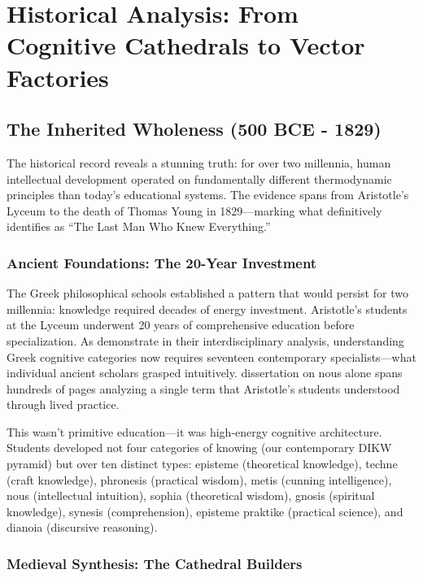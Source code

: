 \section{Historical Analysis: From Cognitive Cathedrals to Vector Factories}

\subsection{The Inherited Wholeness (500 BCE - 1829)}

The historical record reveals a stunning truth: for over two millennia, human intellectual development operated on fundamentally different thermodynamic principles than today's educational systems. The evidence spans from Aristotle's Lyceum to the death of Thomas Young in 1829---marking what \citet{robinson2006} definitively identifies as ``The Last Man Who Knew Everything.''

\subsubsection{Ancient Foundations: The 20-Year Investment}

The Greek philosophical schools established a pattern that would persist for two millennia: knowledge required decades of energy investment. Aristotle's students at the Lyceum underwent 20 years of comprehensive education before specialization. As \citet{mouzala2024} demonstrate in their interdisciplinary analysis, understanding Greek cognitive categories now requires seventeen contemporary specialists---what individual ancient scholars grasped intuitively. \citet{erkizan1997} dissertation on nous alone spans hundreds of pages analyzing a single term that Aristotle's students understood through lived practice.

This wasn't primitive education---it was high-energy cognitive architecture. Students developed not four categories of knowing (our contemporary DIKW pyramid) but over ten distinct types: episteme (theoretical knowledge), techne (craft knowledge), phronesis (practical wisdom), metis (cunning intelligence), nous (intellectual intuition), sophia (theoretical wisdom), gnosis (spiritual knowledge), synesis (comprehension), episteme praktike (practical science), and dianoia (discursive reasoning).

\subsubsection{Medieval Synthesis: The Cathedral Builders}

